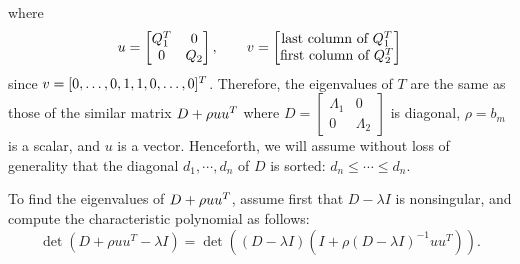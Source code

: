 \message{ !name(eigen-system.tex)}\documentclass{article}
\begin{document}
where
\begin{equation*}
  u =
  \begin{bmatrix}
    Q_1^{T} & 0 \\ 0 & Q_2
  \end{bmatrix}, \qquad
  v =
  \begin{bmatrix}
    \text{last column of $Q_1^{T}$} \\ \text{first column of $Q_2^{T}$}
  \end{bmatrix}
\end{equation*}
since $v = [0,\dots,0,1,1,0,\dots,0]^{T}$. Therefore, the eigenvalues of $T$
are the same as those of the similar matrix $D + \rho uu^{T}$ where $D =
\begin{bmatrix}
  \Lambda_1 & 0 \\ 0 & \Lambda_2
\end{bmatrix}
$ is diagonal, $\rho = b_m$ is a scalar, and $u$ is a vector. Henceforth,
we will assume without loss of generality that the diagonal
$d_1,\cdots,d_n$ of $D$ is sorted: $d_n\leq\cdots\leq d_n$.

To find the eigenvalues of $D + \rho uu^{T}$, assume first that
$D - \lambda I$ is nonsingular, and compute the characteristic polynomial
as follows:
\begin{equation}
  \label{eq:3}
  \det(D + \rho uu^T - \lambda I) 
  = \det((D - \lambda I)(I + \rho(D - \lambda I )^{-1}uu^T)).
\end{equation}




\newpage


\end{document}
